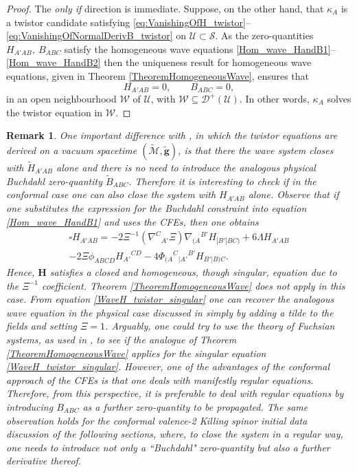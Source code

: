 \documentclass[10pt,a4paper]{article}
\theoremstyle{plain}
\newtheorem{remark}{Remark}
\def\bmg{{\bm g}}
\def\bmH{{\bm H}}
\begin{document}
\begin{proof}
The \emph{only if} direction is immediate. Suppose, on the other hand,
that $\kappa_A$ is a twistor candidate satisfying
\eqref{eq:VanishingOfH_twistor}--\eqref{eq:VanishingOfNormalDerivB_twistor}
on $\mathcal{U}\subset\mathcal{S}$.  As the zero-quantities
$H_{A'AB},~B_{ABC}$ satisfy the homogeneous wave equations
\eqref{Hom_wave_HandB1}--\eqref{Hom_wave_HandB2} then the uniqueness
result for homogeneous wave equations, given in Theorem
\ref{TheoremHomogeneousWave}, ensures that
\[ H_{A'AB}=0,\qquad B_{ABC}=0,\]
in an open neighbourhood $\mathcal{W}$ of $\mathcal{U}$, with
$\mathcal{W}\subseteq\mathcal{D}^{+}(\mathcal{U})$.  In other words, $\kappa_{A}$
solves the twistor equation in $\mathcal{W}$.
\end{proof}

\begin{remark}
\em{One important difference with \cite{GarVal08c}, in which the twistor equations are derived on a vacuum spacetime $(\tilde{\mathcal{M}},\tilde{\bmg})$, is that there the wave system
  closes with $\tilde{H}_{A'AB}$ alone and there is no need to
  introduce the analogous physical Buchdahl zero-quantity
  $\tilde{B}_{ABC}$.  Therefore it is interesting to check if in the
  conformal case one can also close the system with $H_{A'AB}$ alone.
  Observe that if one substitutes the expression for the Buchdahl
  constraint into equation \eqref{Hom_wave_HandB1} and uses the CFEs, then 
  one obtains
\begin{multline}\label{WaveH_twistor_singular}
  \square H_{A'AB} = - 2\Xi^{-1} (\nabla^{C}{}_{A'}\Xi)
  \nabla_{(A}{}^{B'}H_{|B'|BC)}+ 6 \Lambda H_{A'AB} \\-2 \Xi \phi
  _{ABCD}H_{A'}{}^{CD} -4 \Phi_{(A}{}^{C}{}_{|A'}{}^{B'}H_{B'|B)C}.
 \end{multline}
Hence, $\bmH$ satisfies a closed and homogeneous, though \emph{singular}, equation
due to the $\Xi^{-1}$ coefficient. Theorem
\ref{TheoremHomogeneousWave} does not apply in this case.  From equation
\eqref{WaveH_twistor_singular} one can recover the analogous wave
equation in the physical case discussed in \cite{GarVal08c} simply by
adding a tilde to the fields and setting $\Xi=1$. Arguably, one could try to use the theory of \textit{Fuchsian
  systems}, as used in \cite{ChrPaetz13,Pae14a}, to see if the
analogue of Theorem \ref{TheoremHomogeneousWave} applies for the
singular equation \eqref{WaveH_twistor_singular}.  However, one of the
advantages of the conformal approach of the CFEs is that one deals
with manifestly regular equations.  Therefore, from this perspective,
it is preferable to deal with regular equations by introducing $B_{ABC}$ as a further
zero-quantity to be propagated.  The same observation holds for the
conformal valence-2 Killing spinor initial data discussion of the
following sections, where, to close the system in a regular way, one
needs to introduce not only a ``Buchdahl" zero-quantity but also a
further derivative thereof.}
\end{remark}
\end{document}
